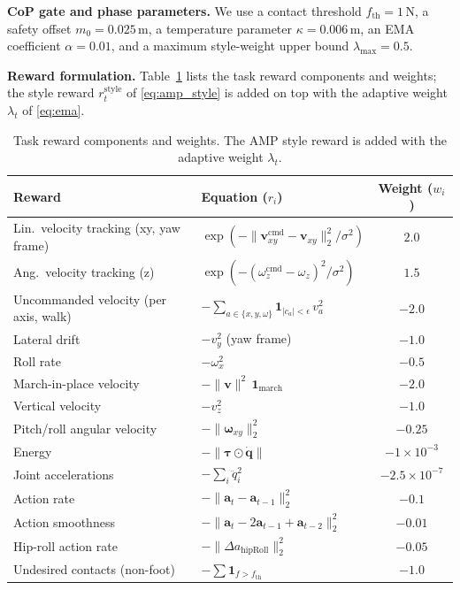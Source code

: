 \documentclass[conference]{IEEEtran}
\begin{document}
\noindent\textbf{CoP gate and phase parameters.}
We use a contact threshold $f_{\mathrm{th}}=1$\,N, a safety offset $m_0=0.025$\,m, a temperature parameter $\kappa=0.006$\,m, an EMA coefficient $\alpha=0.01$, and a maximum style-weight upper bound $\lambda_{\max}=0.5$.

\noindent\textbf{Reward formulation.}
Table~\ref{tab:rewards} lists the task reward components and weights; the style reward $r^{\mathrm{style}}_t$ of \eqref{eq:amp_style} is added on top with the adaptive weight $\lambda_t$ of \eqref{eq:ema}.

\begin{table}[t]
  \centering
  \caption{Task reward components and weights. The AMP style reward is added with the adaptive weight $\lambda_t$.}
  \label{tab:rewards}
  \begin{tabular}{llc}
    \toprule
    Reward & Equation ($r_i$) & Weight ($w_i$) \\
    \midrule
    Lin.\ velocity tracking (xy, yaw frame) & $\exp(-\|\mathbf{v}_{xy}^{\mathrm{cmd}}-\mathbf{v}_{xy}\|_2^2/\sigma^2)$ & $2.0$ \\
    Ang.\ velocity tracking (z) & $\exp(-(\omega_z^{\mathrm{cmd}}-\omega_z)^2/\sigma^2)$ & $1.5$ \\
    Uncommanded velocity (per axis, walk) & $-\sum_{a\in\{x,y,\omega\}}\mathbf{1}_{|c_a|<\epsilon}\,v_a^2$ & $-2.0$ \\
    Lateral drift & $-v_y^2$ (yaw frame) & $-1.0$ \\
    Roll rate & $-\omega_x^2$ & $-0.5$ \\
    March-in-place velocity & $-\|\mathbf{v}\|^2\,\mathbf{1}_{\mathrm{march}}$ & $-2.0$ \\
    Vertical velocity & $-v_z^2$ & $-1.0$ \\
    Pitch/roll angular velocity & $-\|\boldsymbol{\omega}_{xy}\|_2^2$ & $-0.25$ \\
    Energy & $-\|\boldsymbol{\tau}\odot\dot{\mathbf{q}}\|$ & $-1\times10^{-3}$ \\
    Joint accelerations & $-\sum_i \ddot{q}_i^2$ & $-2.5\times10^{-7}$ \\
    Action rate & $-\|\mathbf{a}_t-\mathbf{a}_{t-1}\|_2^2$ & $-0.1$ \\
    Action smoothness & $-\|\mathbf{a}_t-2\mathbf{a}_{t-1}+\mathbf{a}_{t-2}\|_2^2$ & $-0.01$ \\
    Hip-roll action rate & $-\|\Delta a_{\mathrm{hipRoll}}\|_2^2$ & $-0.05$ \\
    Undesired contacts (non-foot) & $-\sum\mathbf{1}_{f>f_{\mathrm{th}}}$ & $-1.0$ \\

\end{tabular}
\end{table}
\end{document}
